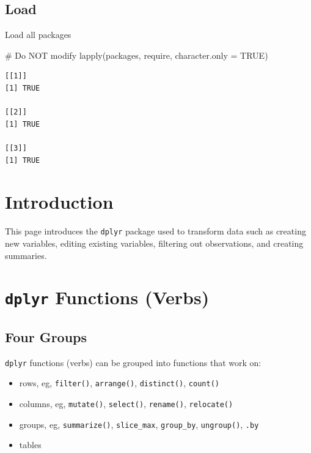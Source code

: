 \documentclass[
  letterpaper,
  DIV=11,
  numbers=noendperiod]{scrreprt}
\newenvironment{Shaded}{\begin{snugshade}}{\end{snugshade}}
\newcommand{\AttributeTok}[1]{\textcolor[rgb]{0.40,0.45,0.13}{#1}}
\newcommand{\CommentTok}[1]{\textcolor[rgb]{0.37,0.37,0.37}{#1}}
\newcommand{\ConstantTok}[1]{\textcolor[rgb]{0.56,0.35,0.01}{#1}}
\newcommand{\FunctionTok}[1]{\textcolor[rgb]{0.28,0.35,0.67}{#1}}
\newcommand{\NormalTok}[1]{\textcolor[rgb]{0.00,0.23,0.31}{#1}}
\providecommand{\tightlist}{%
  \setlength{\itemsep}{0pt}\setlength{\parskip}{0pt}}\usepackage{longtable,booktabs,array}
\begin{document}
\subsection*{Load}\label{load-5}

Load all packages

\begin{Shaded}
\begin{Highlighting}[]
\CommentTok{\# Do NOT modify}
\FunctionTok{lapply}\NormalTok{(packages, require, }\AttributeTok{character.only =} \ConstantTok{TRUE}\NormalTok{)}
\end{Highlighting}
\end{Shaded}

\begin{verbatim}
[[1]]
[1] TRUE

[[2]]
[1] TRUE

[[3]]
[1] TRUE
\end{verbatim}

\section{Introduction}\label{introduction-2}

This page introduces the \texttt{dplyr} package used to transform data
such as creating new variables, editing existing variables, filtering
out observations, and creating summaries.

\section{\texorpdfstring{\texttt{dplyr} Functions
(Verbs)}{dplyr Functions (Verbs)}}\label{dplyr-functions-verbs}

\subsection{Four Groups}\label{four-groups}

\texttt{dplyr} functions (verbs) can be grouped into functions that work
on:

\begin{itemize}
\tightlist
\item
  rows, eg, \texttt{filter()}, \texttt{arrange()}, \texttt{distinct()},
  \texttt{count()}
\item
  columns, eg, \texttt{mutate()}, \texttt{select()}, \texttt{rename()},
  \texttt{relocate()}
\item
  groups, eg, \texttt{summarize()}, \texttt{slice\_max},
  \texttt{group\_by}, \texttt{ungroup()}, \texttt{.by}
\item
  tables
\end{itemize}
\end{document}
